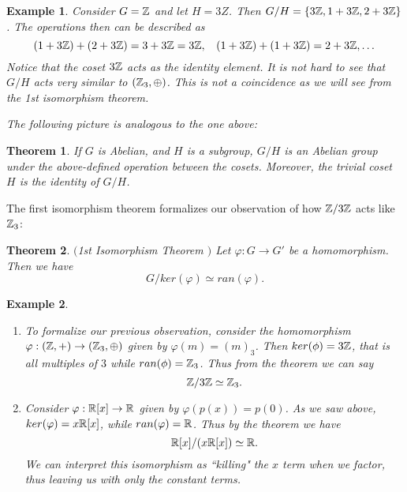 \documentclass[12pt]{article}
\theoremstyle{plain}
\newtheorem{example}{Example}
\newtheorem{theorem}{Theorem}
\theoremstyle{definition}
\theoremstyle{remark}
\begin{document}
\begin{example}
Consider $G = \mathbb{Z}$ and let $H=3Z$. Then $G/H = \{3\mathbb{Z}, 1+3\mathbb{Z}, 2+3\mathbb{Z}\}$. The operations then can be described as 
$$(1+3\mathbb{Z})+(2+3\mathbb{Z}) = 3+3\mathbb{Z} = 3\mathbb{Z}, \:\:\:\: (1+3\mathbb{Z})+(1+3\mathbb{Z}) = 2+3\mathbb{Z}, \dots$$
Notice that the coset $3\mathbb{Z}$ acts as the identity element. It is not hard to see that $G/H$ acts very similar to $(\mathbb{Z}_3, \oplus)$. This is not a coincidence as we will see from the 1st isomorphism theorem. 

The following picture is analogous to the one above:

\bigskip



\end{example}
\begin{theorem}
If $G$ is Abelian, and $H$ is a subgroup, $G/H$ is an Abelian group under the above-defined operation between the cosets. Moreover, the trivial coset $H$ is the identity of $G/H$. 
\end{theorem}
The first isomorphism theorem formalizes our observation of how $\mathbb{Z}/3\mathbb{Z}$ acts like $\mathbb{Z}_3$:
\begin{theorem}$($1st Isomorphism Theorem $)$
Let $\varphi: G\rightarrow G'$ be a homomorphism. Then we have 
$$G/ker(\varphi) \simeq ran(\varphi).$$
\end{theorem}

\begin{example}
\begin{enumerate}
    \item To formalize our previous observation, consider the homomorphism $\varphi:(\mathbb{Z},+) \rightarrow (\mathbb{Z}_3, \oplus)$ given by $\varphi(m) = (m)_3$. Then $ker(\phi) = 3\mathbb{Z}$, that is all multiples of $3$ while $ran(\phi) = \mathbb{Z}_3$. Thus from the theorem we can say 
    $$\mathbb{Z}/3\mathbb{Z} \simeq \mathbb{Z}_3.$$
    \item Consider $\varphi:\mathbb{R}[x]\rightarrow \mathbb{R}$ given by $\varphi(p(x)) = p(0)$. As we saw above, $ker(\varphi) = x\mathbb{R}[x]$, while $ran(\varphi)=\mathbb{R}$. Thus by the theorem we have 
    $$\mathbb{R}[x]/(x\mathbb{R}[x]) \simeq \mathbb{R}.$$ We can interpret this isomorphism as ``killing" the $x$ term when we factor, thus leaving us with only the constant terms. 
\end{enumerate}
\end{example}
\end{document}
